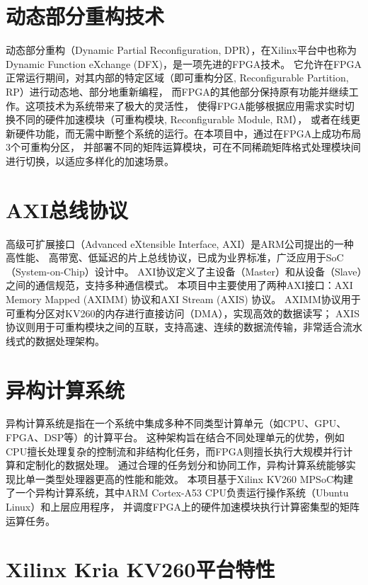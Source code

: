 \section{动态部分重构技术}

动态部分重构（Dynamic Partial Reconfiguration, DPR），在Xilinx平台中也称为Dynamic Function eXchange (DFX)，是一项先进的FPGA技术。
它允许在FPGA正常运行期间，对其内部的特定区域（即可重构分区, Reconfigurable Partition, RP）进行动态地、部分地重新编程，
而FPGA的其他部分保持原有功能并继续工作。这项技术为系统带来了极大的灵活性，
使得FPGA能够根据应用需求实时切换不同的硬件加速模块（可重构模块, Reconfigurable Module, RM），
或者在线更新硬件功能，而无需中断整个系统的运行。在本项目中，通过在FPGA上成功布局3个可重构分区，
并部署不同的矩阵运算模块，可在不同稀疏矩阵格式处理模块间进行切换，以适应多样化的加速场景。

\section{AXI总线协议}

高级可扩展接口（Advanced eXtensible Interface, AXI）是ARM公司提出的一种高性能、
高带宽、低延迟的片上总线协议，已成为业界标准，广泛应用于SoC（System-on-Chip）设计中。
AXI协议定义了主设备（Master）和从设备（Slave）之间的通信规范，支持多种通信模式。
本项目中主要使用了两种AXI接口：AXI Memory Mapped (AXIMM) 协议和AXI Stream (AXIS) 协议。
AXIMM协议用于可重构分区对KV260的内存进行直接访问（DMA），实现高效的数据读写；
AXIS协议则用于可重构模块之间的互联，支持高速、连续的数据流传输，非常适合流水线式的数据处理架构。

\section{异构计算系统}

异构计算系统是指在一个系统中集成多种不同类型计算单元（如CPU、GPU、FPGA、DSP等）的计算平台。
这种架构旨在结合不同处理单元的优势，例如CPU擅长处理复杂的控制流和非结构化任务，而FPGA则擅长执行大规模并行计算和定制化的数据处理。
通过合理的任务划分和协同工作，异构计算系统能够实现比单一类型处理器更高的性能和能效。
本项目基于Xilinx KV260 MPSoC构建了一个异构计算系统，其中ARM Cortex-A53 CPU负责运行操作系统（Ubuntu Linux）和上层应用程序，
并调度FPGA上的硬件加速模块执行计算密集型的矩阵运算任务。

\section{Xilinx Kria KV260平台特性}

